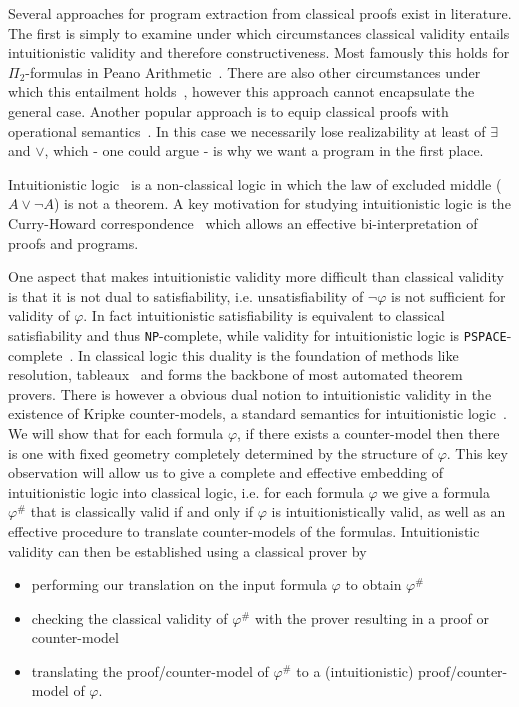 \documentclass[a4paper,UKenglish,cleveref, autoref, thm-restate]{lipics-v2021}
\begin{document}
Several approaches for program extraction from classical proofs exist in literature. The first is simply to examine under which circumstances classical validity entails intuitionistic validity and therefore constructiveness. Most famously this holds for $\Pi_2$-formulas in Peano Arithmetic~\cite{friedman1978classically}. There are also other circumstances under which this entailment holds~\cite{schwichtenberg}, however this approach cannot encapsulate the general case. Another popular approach is to equip classical proofs with operational semantics~\cite{Control1, Parigot1}. In this case we necessarily lose realizability at least of $\exists$ and $\vee$, which - one could argue - is why we want a program in the first place.

Intuitionistic logic~\cite{sep-logic-intuitionistic} is a non-classical logic in which the law of excluded middle ($A\vee \neg A$) is not a theorem. A key motivation for studying intuitionistic logic is the Curry-Howard correspondence~\cite{howard1980formulae} which allows an effective bi-interpretation of proofs and programs.

One aspect that makes intuitionistic validity more difficult than classical validity is that it is not dual to satisfiability, i.e. unsatisfiability of $\neg\varphi$ is not sufficient for validity of $\varphi$. In fact intuitionistic satisfiability is equivalent to classical satisfiability and thus \verb+NP+-complete, while validity for intuitionistic logic is \verb+PSPACE+-complete~\cite{statman1979intuitionistic}. In classical logic this duality is the foundation of methods like resolution, tableaux~\cite{fitting2012first} and forms the backbone of most automated theorem provers. There is however a obvious dual notion to intuitionistic validity in the existence of Kripke counter-models, a standard semantics for intuitionistic logic~\cite{sep-logic-intuitionistic}. We will show that for each formula $\varphi$, if there exists a counter-model then there is one with fixed geometry completely determined by the structure of $\varphi$. This key observation will allow us to give a complete and effective embedding of intuitionistic logic into classical logic, i.e. for each formula $\varphi$ we give a formula $\varphi^\#$ that is classically valid if and only if $\varphi$ is intuitionistically valid, as well as an effective procedure to translate counter-models of the formulas. Intuitionistic validity can then be established using a classical prover by
\begin{itemize}
	\item performing our translation on the input formula $\varphi$ to obtain $\varphi^\#$
	\item checking the classical validity of $\varphi^\#$ with the prover resulting in a proof or counter-model
	\item translating the proof/counter-model of $\varphi^\#$ to a (intuitionistic) proof/counter-model of $\varphi$.
\end{itemize}
\end{document}

